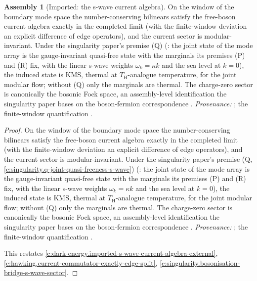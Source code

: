\documentclass[11pt]{article}
\theoremstyle{definition}
\newtheorem{assembled}[theorem]{Assembly}
\theoremstyle{plain}
\newcommand{\changedmark}[2]{\marginpar{\raggedright\scriptsize\color{#1}#2}}
\providecommand{\TH}{}\renewcommand{\TH}{T_{\mathrm{H}}}
\begin{document}
\begin{assembled}[Imported: the s-wave current algebra]\label{c:dark-energy.imported-s-wave-current-algebra}
\changedmark{gray}{reworded}
On the window of the boundary mode space the number-conserving bilinears satisfy the free-boson current algebra exactly in the completed limit (with the finite-window deviation an explicit difference of edge operators), and the current sector is modular-invariant. Under the singularity paper's premise (Q) (\cite[Premise~8.1]{ButlerT5}: the joint state of the mode array is the gauge-invariant quasi-free state with the marginals its premises (P) and (R) fix, with the linear s-wave weights $\omega_k = \kappa k$ and the sea level at $k = 0$), the induced state is KMS, thermal at $\TH$-analogue temperature, for the joint modular flow; without (Q) only the marginals are thermal. The charge-zero sector is canonically the bosonic Fock space, an assembly-level identification the singularity paper bases on the boson-fermion correspondence \cite{PressleySegal1986}. \emph{Provenance:} \cite[\S 8, Premise~8.1]{ButlerT5}; the finite-window quantification \cite[\S 6]{ButlerT7}.
\end{assembled}
\begin{proof}
On the window of the boundary mode space the number-conserving bilinears satisfy the free-boson current algebra exactly in the completed limit (with the finite-window deviation an explicit difference of edge operators), and the current sector is modular-invariant. Under the singularity paper's premise (Q, \ref{c:singularity.q-joint-quasi-freeness-s-wave}) (\cite[Premise~8.1]{ButlerT5}: the joint state of the mode array is the gauge-invariant quasi-free state with the marginals its premises (P) and (R) fix, with the linear s-wave weights $\omega_k = \kappa k$ and the sea level at $k = 0$), the induced state is KMS, thermal at $\TH$-analogue temperature, for the joint modular flow; without (Q) only the marginals are thermal. The charge-zero sector is canonically the bosonic Fock space, an assembly-level identification the singularity paper bases on the boson-fermion correspondence \cite{PressleySegal1986}. \emph{Provenance:} \cite[\S 8, Premise~8.1]{ButlerT5}; the finite-window quantification \cite[\S 6]{ButlerT7}.

This restates \ref{c:dark-energy.imported-s-wave-current-algebra-external}, \ref{c:hawking.current-commutator-exactly-edge-split}, \ref{c:singularity.bosonisation-bridge-s-wave-sector}.

\end{proof}
\end{document}
